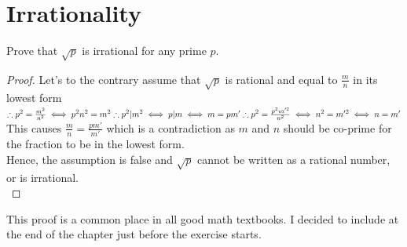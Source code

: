 \section{Irrationality}
\begin{example}
    Prove that $\sqrt{p}$ is irrational for any prime $p$.
\end{example}
\begin{proof}
    Let's to the contrary assume that $\sqrt{p}$ is rational and equal to $\frac{m}{n}$ in its lowest form\\
    $\therefore p^2=\frac{m^2}{n^2}\\
    \iff p^2n^2=m^2\\
    \therefore p^2| m^2 \iff p|m \iff m=pm'\\
    \therefore p^2=\frac{p^2 m'^2}{n^2}\\
    \iff n^2=m'^2 \iff n=m'$\\
    This causes $\frac{m}{n}=\frac{p m'}{m'}$ which is a contradiction as $m$ and $n$ should be co-prime for the fraction to be in the lowest form.\\
    Hence, the assumption is false and $\sqrt{p}$ cannot be written as a rational number, or is irrational.\\
\end{proof}
This proof is a common place in all good math textbooks. I decided to include at the end of the chapter just before the exercise starts.\\
